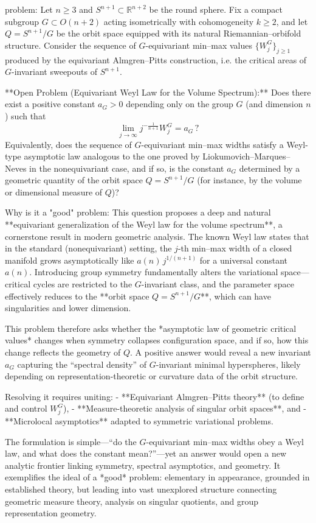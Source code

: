 problem:  
Let \( n\ge 3 \) and \( S^{n+1}\subset\mathbb{R}^{n+2} \) be the round sphere.  
Fix a compact subgroup \( G\subset O(n+2) \) acting isometrically with cohomogeneity \( k\ge 2 \), and let \( Q=S^{n+1}/G \) be the orbit space equipped with its natural Riemannian–orbifold structure.  
Consider the sequence of \(G\)-equivariant min–max values \( \{W_j^G\}_{j\ge1} \) produced by the equivariant Almgren–Pitts construction, i.e. the critical areas of \(G\)-invariant sweepouts of \(S^{n+1}\).  

**Open Problem (Equivariant Weyl Law for the Volume Spectrum):**  
Does there exist a positive constant \( a_G > 0 \) depending only on the group \( G \) (and dimension \(n\)) such that  
\[
\lim_{j\to\infty} j^{-\frac{1}{n+1}} W_j^G = a_G\,?
\]
Equivalently, does the sequence of \(G\)-equivariant min–max widths satisfy a Weyl-type asymptotic law analogous to the one proved by Liokumovich–Marques–Neves in the nonequivariant case, and if so, is the constant \(a_G\) determined by a geometric quantity of the orbit space \(Q=S^{n+1}/G\) (for instance, by the volume or dimensional measure of \(Q\))?

Why is it a "good" problem:  
This question proposes a deep and natural **equivariant generalization of the Weyl law for the volume spectrum**, a cornerstone result in modern geometric analysis.  
The known Weyl law states that in the standard (nonequivariant) setting, the \(j\)-th min–max width of a closed manifold grows asymptotically like \(a(n)\, j^{1/(n+1)}\) for a universal constant \(a(n)\).  
Introducing group symmetry fundamentally alters the variational space—critical cycles are restricted to the \(G\)-invariant class, and the parameter space effectively reduces to the **orbit space \(Q=S^{n+1}/G\)**, which can have singularities and lower dimension.  

This problem therefore asks whether the *asymptotic law of geometric critical values* changes when symmetry collapses configuration space, and if so, how this change reflects the geometry of \(Q\). A positive answer would reveal a new invariant \(a_G\) capturing the “spectral density” of \(G\)-invariant minimal hyperspheres, likely depending on representation-theoretic or curvature data of the orbit structure.  

Resolving it requires uniting:
- **Equivariant Almgren–Pitts theory** (to define and control \(W_j^G\)),  
- **Measure-theoretic analysis of singular orbit spaces**, and  
- **Microlocal asymptotics** adapted to symmetric variational problems.  

The formulation is simple—“do the \(G\)-equivariant min–max widths obey a Weyl law, and what does the constant mean?”—yet an answer would open a new analytic frontier linking symmetry, spectral asymptotics, and geometry.  
It exemplifies the ideal of a *good* problem: elementary in appearance, grounded in established theory, but leading into vast unexplored structure connecting geometric measure theory, analysis on singular quotients, and group representation geometry.